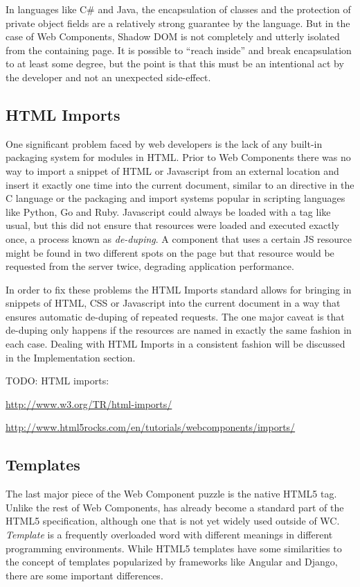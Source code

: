 In languages like C\# and Java, the encapsulation of classes and the protection of private object fields are a relatively strong guarantee by the language.
But in the case of Web Components, Shadow DOM is not completely and utterly isolated from the containing page.
It is possible to ``reach inside'' and break encapsulation to at least some degree, 
but the point is that this must be an intentional act by the developer and not an unexpected side-effect.

\subsection{HTML Imports}
One significant problem faced by web developers is the lack of any built-in packaging system for modules in HTML.
Prior to Web Components there was no way to import a snippet of HTML or Javascript from an external location and insert it exactly one time into the current document, similar to an  directive in the C language or the packaging and import systems popular in scripting languages like Python, Go and Ruby. 
Javascript could always be loaded with a  tag like usual, but this did not ensure that resources were loaded and executed exactly once, a process known as \textit{de-duping}.
A component that uses a certain JS resource might be found in two different spots on the page but that resource would be requested from the server twice, degrading application performance.

In order to fix these problems the HTML Imports standard allows for bringing in snippets of HTML, CSS or Javascript into the current document in a way that ensures automatic de-duping of repeated requests.
The one major caveat is that de-duping only happens if the resources are named in exactly the same fashion in each case.
Dealing with HTML Imports in a consistent fashion will be discussed in the Implementation section.

TODO: HTML imports:

\url{http://www.w3.org/TR/html-imports/}

\url{http://www.html5rocks.com/en/tutorials/webcomponents/imports/}


\subsection{Templates}
The last major piece of the Web Component puzzle is the native HTML5  tag. 
Unlike the rest of Web Components,  has already become a standard part of the HTML5 specification, although one that is not yet widely used outside of WC.
\textit{Template} is a frequently overloaded word with different meanings in different programming environments.
While HTML5 templates have some similarities to the concept of templates popularized by frameworks like Angular and Django, there are some important differences.

